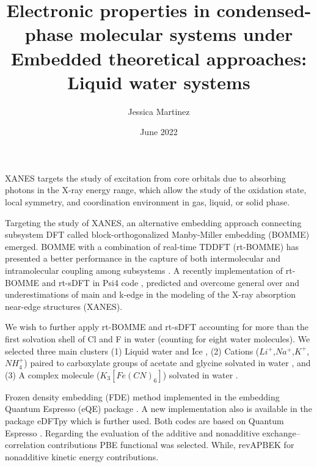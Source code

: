 \documentclass[notitlepage,12pt]{report}
\begin{document}
	\title{Electronic properties in condensed-phase molecular systems under Embedded theoretical approaches: Liquid water systems}
	\author[1]{Jessica Martinez}
	\date{June 2022}
	\renewcommand\Affilfont{\itshape\small}
	\thispagestyle{empty}
\maketitle

	XANES targets the study of excitation from core orbitals due to absorbing photons in the X-ray energy range\supercite{fransson2016x}, which allow the study of the oxidation state, local symmetry, and coordination environment in gas, liquid, or solid phase\supercite{rehr2005progress,koningsberger1987x}. 
	
	Targeting the study of XANES, an alternative embedding approach connecting subsystem DFT\supercite{mi2021eqe,mi2019nonlocal,mi2019ab} called block-orthogonalized Manby-Miller embedding (BOMME)\supercite{ding2017embedded} emerged. BOMME with a combination of real-time TDDFT (rt-BOMME) has presented a better performance in the capture of both intermolecular and intramolecular coupling among subsystems \supercite{koh2017accelerating}. A recently implementation of rt-BOMME and rt-sDFT \supercite{de2021environment} in Psi4 code \supercite{smith2020psi4}, predicted and overcome general over and underestimations of main and k-edge in the modeling of the X-ray absorption near-edge structures (XANES).
	
	We wish to further apply rt-BOMME and rt-sDFT accounting for more than the first solvation shell of Cl and F in water (counting for eight water molecules). We selected three main clusters (1) Liquid water\supercite{gaiduk2018electron} and Ice \supercite{bergmann2007nearest,zhovtobriukh2019x}, (2) Cations ($Li^{+}$,$Na^{+}$,$K^{+}$,$NH_4^{+}$) paired to carboxylate groups of acetate and glycine solvated in water \supercite{aziz2008cation}, and (3) A complex molecule ($K_3[Fe(CN)_6]$) solvated in water \supercite{zheng2018enabling}. 
	
	Frozen density embedding (FDE) method implemented in the embedding Quantum Espresso (eQE) package \supercite{genova2017eqe}. A new implementation also is available in the package eDFTpy\supercite{edftpy} which is further used. Both codes are based on Quantum Espresso \supercite{qe}. Regarding the evaluation of the additive and nonadditive exchange--correlation contributions PBE functional \supercite{perdew1996phys} was selected. While, revAPBEK \supercite{laricchia2011generalized} for nonadditive kinetic energy contributions. 
\end{document}
